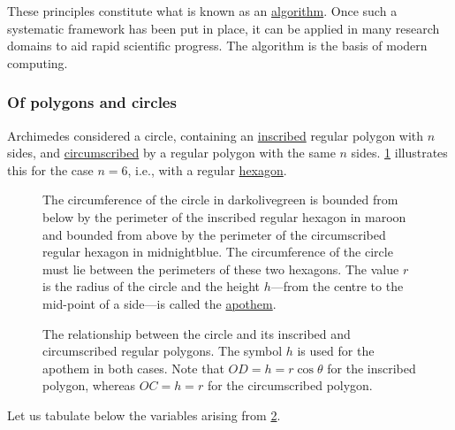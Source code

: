 \documentclass[
  a4paper,
]{article}
\begin{document}
These principles constitute what is known as an
\href{https://www.merriam-webster.com/dictionary/algorithm}{algorithm}.
Once such a systematic framework has been put in place, it can be
applied in many research domains to aid rapid scientific progress. The
algorithm is the basis of modern computing.

\subsubsection{Of polygons and circles}\label{of-polygons-and-circles}

Archimedes considered a circle, containing an
\href{https://mathworld.wolfram.com/Inscribed.html}{inscribed} regular
polygon with \(n\) sides, and
\href{https://mathworld.wolfram.com/Circumscribed.html}{circumscribed}
by a regular polygon with the same \(n\) sides. \cref{fig:two-limits}
illustrates this for the case \(n = 6\), i.e., with a regular
\href{https://www.britannica.com/science/hexagon}{hexagon}.

\begin{figure}
\centering

\caption{The circumference of the circle in darkolivegreen is bounded
from below by the perimeter of the inscribed regular hexagon in maroon
and bounded from above by the perimeter of the circumscribed regular
hexagon in midnightblue. The circumference of the circle must lie
between the perimeters of these two hexagons. The value \(r\) is the
radius of the circle and the height \(h\)---from the centre to the
mid-point of a side---is called the
\href{https://en.wikipedia.org/wiki/Apothem}{apothem}.}\label{fig:two-limits}
\end{figure}

\begin{figure}
\centering

\caption{The relationship between the circle and its inscribed and
circumscribed regular polygons. The symbol \(h\) is used for the apothem
in both cases. Note that \(OD = h = r\cos\theta\) for the inscribed
polygon, whereas \(OC = h = r\) for the circumscribed
polygon.}\label{fig:sin-theta-tan-theta}
\end{figure}

Let us tabulate below the variables arising from
\cref{fig:sin-theta-tan-theta}.
\end{document}

